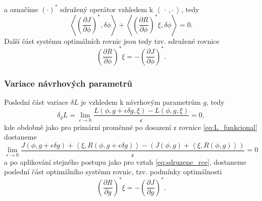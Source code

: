 a označíme $ (\cdot)^* $ sdružený operátor vzhledem k $  \left\langle \, \cdot\,,\cdot \,  \right\rangle $, tedy
\begin{equation*}
\left\langle   \left(\frac{\partial J}{\partial \phi}\right)^* ,\delta\phi  \right\rangle
+  \left\langle \left(\dfrac{\partial R}{\partial \phi}\right)^* \xi ,  \delta\phi\right\rangle
=0.
\end{equation*}
Další část systému optimálních rovnic jsou tedy tzv. sdružené rovnice \cite{karman1997inverse}
\begin{equation}\label{eq:sdruzene_rce}
\left( \dfrac{\partial R}{\partial \phi} \right)^* \xi = 
- \left(\dfrac{\partial J}{\partial \phi}\right)^*.
\end{equation}

\subsubsection{Variace návrhových parametrů}

Poslední část variace $ \delta L $ je vzhledem k návrhovým parametrům $ g $, tedy
\begin{equation*}
\delta_g L =
\lim\limits_{\epsilon\rightarrow 0}
\dfrac{L(\phi,g+\epsilon\delta g,\xi)-L(\phi,g,\xi)}
{\epsilon}
=0,
\end{equation*}
kde obdobně jako pro primární proměnné po dosazení z rovnice \ref{eq:L_funkcional} dostaneme
\begin{equation*}
\lim\limits_{\epsilon\rightarrow0} \dfrac
{J(\phi, g+\epsilon\delta g) + 
	 \left\langle\xi , R(\phi, g+\epsilon\delta g)\right\rangle  -  (J(\phi, g) +  \left\langle\xi , R(\phi, g)\right\rangle)}
{\epsilon}
=0
\end{equation*}
a po aplikování stejného postupu jako pro vztah \ref{eq:sdruzene_rce}, dostaneme poslední část optimálního systému rovnic, tzv. podmínky optimálnosti \cite{karman1997inverse}
\begin{equation}\label{eq:podminky_optimalnosti}
\left( \dfrac{\partial R}{\partial g} \right)^* \xi = 
- \left(\dfrac{\partial J}{\partial g}\right)^*.
\end{equation}

